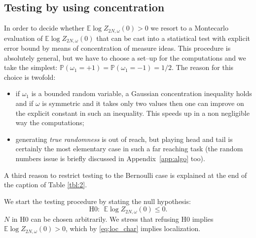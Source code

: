 \documentclass[reqno,11pt]{amsart}
\numberwithin{equation}{section}
\newcommand{\bbE}{{\ensuremath{\mathbb E}} }
\newcommand{\bbP}{{\ensuremath{\mathbb P}} }
\newcommand{\go}{\omega}
\begin{document}
\subsection{Testing by using concentration}
In order to decide whether  $\bbE\log Z_{2N, \go}(0)>0$ we
resort to a Montecarlo evaluation of $\bbE\log Z_{2N, \go}(0)$
that can be cast into a statistical test with explicit error bound
by means of concentration of measure ideas.
This procedure is absolutely general, but we have to choose
a set--up for the computations and we take the simplest:
 $\bbP(\go_1=+1)=\bbP(\go_1=-1)=1/2$.
 The reason for this choice is twofold:
 \begin{itemize}
 \item if $\go_1$ is a bounded random variable, a Gaussian concentration
 inequality holds and if $\go$ is symmetric and it takes only two values
 then one can improve on the explicit constant in such an inequality.
 This speeds up in a non negligible   way the computations;
 \item generating {\sl true randomness}
is out of reach, but playing head and tail is certainly
the most elementary case in such a far reaching task (the random numbers
issue is briefly discussed in Appendix~\ref{app:algo} too).
 \end{itemize}

\smallskip
A third reason to restrict testing to the Bernoulli case is explained at the end of the
caption of Table \ref{tbl:2}.
\smallskip

We start the testing procedure by stating the null hypothesis:
\begin{equation}
\label{eq:H0}
\text{H}0: \  \ \bbE\log Z_{2N, \go}(0)\le 0.
\end{equation}
$N$ in H0  can be chosen
arbitrarily. We stress that refusing H0 implies $\bbE\log Z_{2N, \go}(0)>0$,
which by \eqref{eq:loc_char} implies localization.
\end{document}
